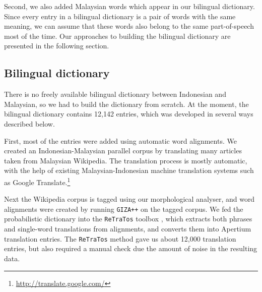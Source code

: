 \documentclass[10pt,a5paper,twoside]{article}
\begin{document}
Second, we also added Malaysian words which appear in our bilingual dictionary. Since every entry in a bilingual dictionary is a pair of words with the same meaning, we can assume that these words also belong to the same part-of-speech most of the time. Our approaches to building the bilingual dictionary are presented in the following section.

\subsection{Bilingual dictionary}


There is no freely available bilingual dictionary between Indonesian and Malaysian, so we had to build the dictionary from scratch. At the moment, the bilingual dictionary contains 12,142 entries, which was developed in several ways described below.

First, most of the entries were added using automatic word alignments. We created an Indonesian-Malaysian parallel corpus by translating many articles taken from Malaysian Wikipedia. The translation process is mostly automatic, with the help of existing Malaysian-Indonesian machine translation systems such as Google Translate.\footnote{\url{http://translate.google.com/}}

Next the Wikipedia corpus is tagged using our morphological analyser, and word alignments were created by running \texttt{GIZA++} \citep{Och2003align} on the tagged corpus. We fed the probabilistic dictionary into the \texttt{ReTraTos} toolbox \citep{Caseli2006retratos}, which extracts both phrases and single-word translations from alignments, and converts them into Apertium translation entries. The \texttt{ReTraTos} method gave us about 12,000 translation entries, but also required a manual check due the amount of noise in the resulting data.
\end{document}
